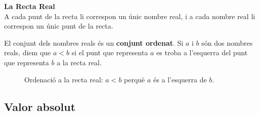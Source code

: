 \documentclass[12pt]{article}
\begin{document}
\begin{concept}
\textbf{La Recta Real}\\
A cada punt de la recta li correspon un únic nombre real, i a cada nombre real li correspon un únic punt de la recta.

El conjunt dels nombres reals és un \textbf{conjunt ordenat}. Si $a$ i $b$ són dos nombres reals, diem que $a < b$ si el punt que representa $a$ es troba a l'esquerra del punt que representa $b$ a la recta real.
\begin{figure}[H]
\centering
{}
\caption{Ordenació a la recta real: \(a<b\) perquè \(a\) és a l'esquerra de \(b\).}
\end{figure}

\end{concept}

\subsection{Valor absolut}
\end{document}
